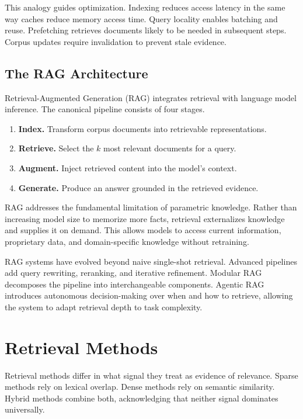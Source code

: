 This analogy guides optimization. Indexing reduces access latency in the same way caches reduce memory access time. Query locality enables batching and reuse. Prefetching retrieves documents likely to be needed in subsequent steps. Corpus updates require invalidation to prevent stale evidence.

\subsection{The RAG Architecture}

Retrieval-Augmented Generation (RAG) \cite{lewis2020rag} integrates retrieval with language model inference. The canonical pipeline consists of four stages.

\begin{enumerate}
\item \textbf{Index.} Transform corpus documents into retrievable representations.
\item \textbf{Retrieve.} Select the $k$ most relevant documents for a query.
\item \textbf{Augment.} Inject retrieved content into the model’s context.
\item \textbf{Generate.} Produce an answer grounded in the retrieved evidence.
\end{enumerate}

RAG addresses the fundamental limitation of parametric knowledge. Rather than increasing model size to memorize more facts, retrieval externalizes knowledge and supplies it on demand. This allows models to access current information, proprietary data, and domain-specific knowledge without retraining.

RAG systems have evolved beyond naive single-shot retrieval. Advanced pipelines add query rewriting, reranking, and iterative refinement. Modular RAG decomposes the pipeline into interchangeable components. Agentic RAG \cite{agenticrag2025} introduces autonomous decision-making over when and how to retrieve, allowing the system to adapt retrieval depth to task complexity.

\section{Retrieval Methods}

Retrieval methods differ in what signal they treat as evidence of relevance. Sparse methods rely on lexical overlap. Dense methods rely on semantic similarity. Hybrid methods combine both, acknowledging that neither signal dominates universally.

